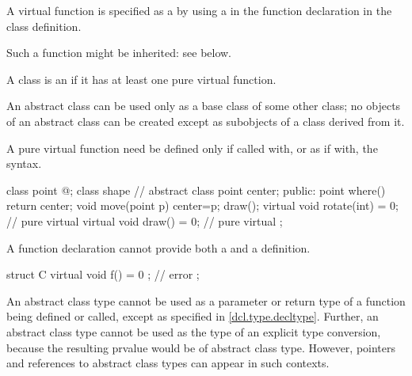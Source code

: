 \pnum
A virtual function is specified as
a  by using a
 in the function declaration
in the class definition.
\begin{note}
Such a function might be inherited: see below.
\end{note}
A class is an 
if it has at least one pure virtual function.
\begin{note}
An abstract class can be used only as a base class of some other class;
no objects of an abstract class can be created
except as subobjects of a class
derived from it.
\end{note}
%
A pure virtual function need be defined only if called with, or as if
with, the 
syntax.
\begin{example}
\begin{codeblock}
class point { @\commentellip@ };
class shape {                   // abstract class
  point center;
public:
  point where() { return center; }
  void move(point p) { center=p; draw(); }
  virtual void rotate(int) = 0; // pure virtual
  virtual void draw() = 0;      // pure virtual
};
\end{codeblock}
\end{example}
\begin{note}
A function declaration cannot provide both a 
and a definition.
\end{note}
\begin{example}
\begin{codeblock}
struct C {
  virtual void f() = 0 { };     // error
};
\end{codeblock}
\end{example}

\pnum
\begin{note}
An abstract class type cannot be used
as a parameter or return type of
a function being defined or called,
except as specified in \ref{dcl.type.decltype}.
Further, an abstract class type cannot be used as
the type of an explicit type conversion,
because the resulting prvalue would be of abstract class type.
However, pointers and references to abstract class types
can appear in such contexts.
\end{note}

